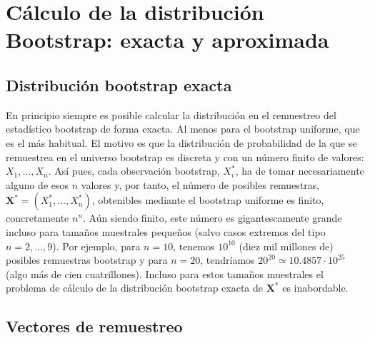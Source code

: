 \documentclass[
]{book}
\theoremstyle{break}
\theoremstyle{definition}
\theoremstyle{definition}
\theoremstyle{definition}
\theoremstyle{remark}
\begin{document}
\hypertarget{cuxe1lculo-de-la-distribuciuxf3n-bootstrap-exacta-y-aproximada}{%
\section{Cálculo de la distribución Bootstrap: exacta y aproximada}\label{cuxe1lculo-de-la-distribuciuxf3n-bootstrap-exacta-y-aproximada}}

\hypertarget{distribuciuxf3n-bootstrap-exacta}{%
\subsection{Distribución bootstrap exacta}\label{distribuciuxf3n-bootstrap-exacta}}

En principio siempre es posible calcular la distribución en el
remuestreo del estadístico bootstrap de forma exacta. Al menos para el
bootstrap uniforme, que es el más habitual. El motivo es que la
distribución de probabilidad de la que se remuestrea en el universo
bootstrap es discreta y con un número finito de valores: \(X_1,\ldots ,X_n\). Así pues, cada observación bootstrap, \(X_i^{\ast}\), ha de
tomar necesariamente alguno de esos \(n\) valores y, por tanto, el número
de posibles remuestras, \(\mathbf{X}^{\ast}=\left( X_1^{\ast },\ldots ,X_n^{\ast} \right)\), obtenibles mediante el bootstrap
uniforme es finito, concretamente \(n^{n}\). Aún siendo finito, este
número es gigantescamente grande incluso para tamaños muestrales
pequeños (salvo casos extremos del tipo \(n=2,\ldots ,9\)). Por ejemplo,
para \(n=10\), tenemos \(10^{10}\) (diez mil millones de) posibles
remuestras bootstrap y para \(n=20\), tendríamos
\(20^{20}\simeq 10.4857\cdot 10^{25}\) (algo más de cien
cuatrillones). Incluso para estos tamaños muestrales el problema de
cálculo de la distribución bootstrap exacta de
\(\mathbf{X}^{\ast}\) es inabordable.

\hypertarget{vectores-de-remuestreo}{%
\subsection{Vectores de remuestreo}\label{vectores-de-remuestreo}}
\end{document}
